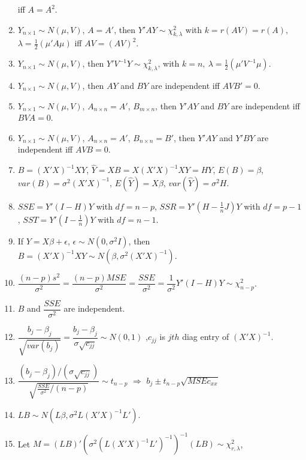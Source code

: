 \documentclass[10pt,landscape]{article}
\begin{document}
\begin{multicols}{3}
\begin{enumerate}
iff $A=A^{2}$.
\item $Y_{n\times1}\sim N\left(\mu,V\right)$, $A=A'$, then $Y'AY\sim\chi_{k,\lambda}^{2}$
with $k=r\left(AV\right)=r\left(A\right),$ $\lambda=\frac{1}{2}\left(\mu'A\mu\right)$
iff $AV=\left(AV\right)^{2}$.
\item $Y_{n\times1}\sim N\left(\mu,V\right)$, then $Y'V^{-1}Y\sim\chi_{k,\lambda}^{2}$,
with $k=n,\ \lambda=\frac{1}{2}\left(\mu'V^{-1}\mu\right)$.
\item $Y_{n\times1}\sim N\left(\mu,V\right)$, then $AY$ and $BY$ are
independent iff $AVB'=0$.
\item $Y_{n\times1}\sim N\left(\mu,V\right)$, $A_{n\times n}=A'$, $B_{m\times n}$,
then $Y'AY$ and $BY$ are independent iff $BVA=0$.
\item $Y_{n\times1}\sim N\left(\mu,V\right)$, $A_{n\times n}=A'$, $B_{n\times n}=B'$,
then $Y'AY$ and $Y'BY$ are independent iff $AVB=0$.
\item $B=\left(X'X\right)^{-1}XY$, $\hat{Y}=XB=X\left(X'X\right)^{-1}XY=HY$,
$E\left(B\right)=\beta$, $var\left(B\right)=\sigma^{2}\left(X'X\right)^{-1}$,
$E\left(\hat{Y}\right)=X\beta$, $var\left(\hat{Y}\right)=\sigma^{2}H$.
\item $SSE=Y'\left(I-H\right)Y$ with $df=n-p$, $SSR=Y'\left(H-\frac{1}{n}J\right)Y$
with $df=p-1$ , $SST=Y'\left(I-\frac{1}{n}\right)Y$ with $df=n-1$. 
\item If $Y=X\beta+\epsilon$, $\epsilon\sim N\left(0,\sigma^{2}I\right)$,
then $B=\left(X'X\right)^{-1}XY\sim N\left(\beta,\sigma^{2}\left(X'X\right)^{-1}\right)$. 
\item $\dfrac{\left(n-p\right)s^{2}}{\sigma^{2}}=\dfrac{\left(n-p\right)MSE}{\sigma^{2}}=\dfrac{SSE}{\sigma^{2}}=\dfrac{1}{\sigma^{2}}Y'\left(I-H\right)Y\sim\chi_{n-p}^{2}$.
\item $B$ and $\dfrac{SSE}{\sigma^{2}}$ are independent. 
\item $\dfrac{b_{j}-\beta_{j}}{\sqrt{var\left(b_{j}\right)}}=\dfrac{b_{j}-\beta_{j}}{\sigma\sqrt{c_{jj}}}\sim N\left(0,1\right)$
,$c_{jj}$ is $jth$ diag entry of $\left(X'X\right)^{-1}$.
\item $\dfrac{\left(b_{j}-\beta_{j}\right)/\left(\sigma\sqrt{c_{jj}}\right)}{\sqrt{\frac{SSE}{\sigma^{2}}/\left(n-p\right)}}\sim t_{n-p}$ $\Rightarrow$ $b_{j}\pm t_{n-p}\sqrt{MSEc_{xx}}$
\item $LB\sim N\left(L\beta,\sigma^{2}L\left(X'X\right)^{-1}L'\right)$.
\item Let $M=\left(LB\right)'\left(\sigma^{2}\left(L\left(X'X\right)^{-1}L'\right)^{-1}\right)^{-1}\left(LB\right)\sim\chi_{r,\lambda}^{2}$,

\end{enumerate}
\end{multicols}
\end{document}
